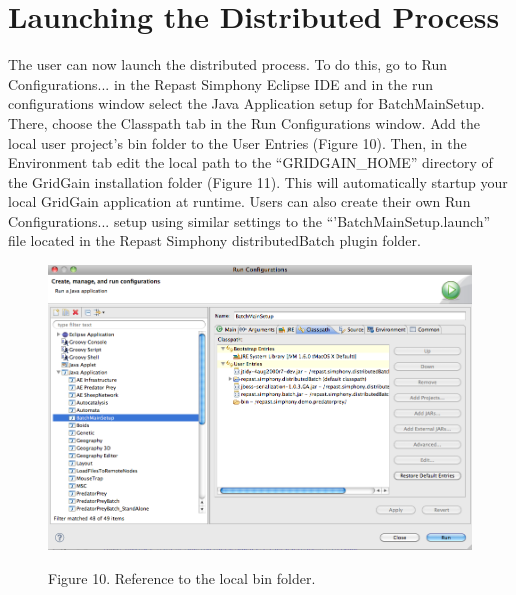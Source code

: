 \documentclass[12pt]{article}
\begin{document}
\section{Launching the Distributed Process}

The user can now launch the distributed process. To do this, go to Run
Configurations... in the Repast Simphony Eclipse IDE and in the
run configurations window select the Java Application setup for
BatchMainSetup. There, choose the Classpath tab in the Run
Configurations window. Add the local user project's bin folder to the
User Entries (Figure 10). Then, in the Environment tab edit the local
path to the “GRIDGAIN\_HOME” directory of the GridGain installation
folder (Figure 11). This will automatically startup your local GridGain
application at runtime. Users can also create their own Run
Configurations... setup using similar
settings to the ``'BatchMainSetup.launch'' file located in the
Repast Simphony distributedBatch plugin folder. 

\begin{figure}[!t]
\begin{center}
\includegraphics [width=\textwidth]{images/Figure10.jpg}
\label{cablehealth}
\begin{minipage}{.9\textwidth}Figure 10. Reference to the local bin folder.
\end{minipage}
\end{center}
\end{figure}
\end{document}
